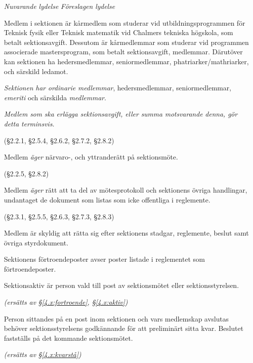 \documentclass{article}
\newenvironment{lydelse}
    {\begin{paracol}{2}%
        \emph{Nuvarande lydelse}%
        \switchcolumn%
        \emph{Föreslagen lydelse}%
    \end{paracol}%
    \begin{enumerate}[label=\thesubsection.\arabic*]%
    \begin{paracol}{2}%
    }{\end{paracol}\end{enumerate}}
\begin{document}
\begin{lydelse}
    \item Medlem i sektionen är kårmedlem som studerar vid utbildningsprogrammen för Teknisk fysik eller Teknisk matematik vid Chalmers tekniska högskola, som betalt sektionsavgift. Dessutom är kårmedlemmar som studerar vid programmen associerade mastersprogram, som betalt sektionsavgift, medlemmar. Därutöver kan sektionen ha hedersmedlemmar, seniormedlemmar, phatri\-arker/\-mathri\-arker, och särskild ledamot.
    
  \switchcolumn
  \setcounter{enumi}{0}
    \item \emph{Sektionen har ordinarie medlemmar}, hedersmedlemmar, seniormedlemmar, \emph{emeriti} och särskilda \emph{medlemmar}.
    
  \switchcolumn*
  \switchcolumn
    \item \emph{Medlem som ska erlägga sektionsavgift, eller summa motsvarande denna, gör detta terminsvis.}

  \switchcolumn*
    (\S 2.2.1, \S 2.5.4, \S 2.6.2, \S 2.7.2, \S 2.8.2)
  \switchcolumn
    \item Medlem \emph{äger} närvaro-, och yttranderätt på sektionsmöte.
      \label{2.1:närvaro}
    
  \switchcolumn*
    (\S 2.2.5, \S 2.8.2)
  \switchcolumn
    \item Medlem \emph{äger} rätt att ta del av mötesprotokoll och sektionens övriga handlingar, undantaget de dokument som listas som icke offentliga i reglemente.
      \label{2.1:offentlighet}
    
  \switchcolumn*
    (\S 2.3.1, \S 2.5.5, \S 2.6.3, \S 2.7.3, \S 2.8.3)

  \switchcolumn
    \item Medlem är skyldig att rätta sig efter sektionens stadgar, regle\-mente, beslut samt övriga styrdokument.
      \label{2.1:skyldig}
    
  \switchcolumn*
  \setcounter{subsection}{4}
  \setcounter{enumi}{0}
    \item Sektionens förtroendeposter avser poster listade i reglementet som förtroendeposter.
    
    \item Sektionsaktiv är person vald till post av sektionsmötet eller sektionsstyrelsen.
    
  \switchcolumn
    \emph{(ersätts av \S \ref{4.x:fortroende}, \S \ref{4.x:aktiv})}

  \switchcolumn*
  \setcounter{subsection}{1}
  \setcounter{enumi}{1}
    \item Person sittandes på en post inom sektionen och vars medlemskap avslutas behöver sektionsstyrelsens godkännande för att preliminärt sitta kvar.
    Beslutet fastställs på det kommande sektionsmötet.

  \switchcolumn
    \emph{(ersätts av \S\ref{4.x:kvarstå})} %
\end{lydelse}
\end{document}
